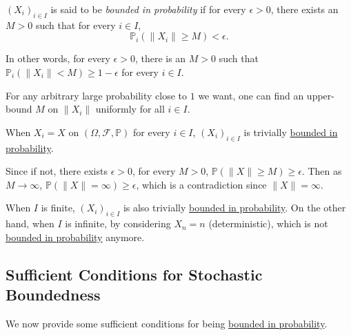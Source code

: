 \begin{definition}\label{def:bounded-in-probability}
	\((X_i)_{i \in I}\) is said to be \emph{bounded in probability} if for every \(\epsilon > 0\), there exists an \(M > 0\) such that for every \(i \in I\),
	\[
		\mathbb{P} _{i}(\lVert X_i \rVert \geq M) < \epsilon .
	\]
\end{definition}

In other words, for every \(\epsilon > 0\), there is an \(M > 0\) such that \(\mathbb{P} _{i}(\lVert X_i \rVert < M) \geq 1 - \epsilon\) for every \(i \in I\).

\begin{intuition}
	For any arbitrary large probability close to \(1\) we want, one can find an upper-bound \(M\) on \(\lVert X_i \rVert \) uniformly for all \(i \in I\).
\end{intuition}

\begin{note}
	When \(X_i = X\) on \((\Omega , \mathscr{F} , \mathbb{P} )\) for every \(i \in I\), \((X_i)_{i \in I}\) is trivially \hyperref[def:bounded-in-probability]{bounded in probability}.
\end{note}
\begin{explanation}
	Since if not, there exists \(\epsilon > 0\), for every \(M > 0\), \(\mathbb{P} (\lVert X \rVert \geq M) \geq \epsilon \). Then as \(M \to \infty \), \(\mathbb{P} (\lVert X \rVert = \infty ) \geq \epsilon \), which is a contradiction since \(\lVert X \rVert = \infty \).
\end{explanation}

\begin{remark}
	When \(I\) is finite, \((X_i)_{i \in I}\) is also trivially \hyperref[def:bounded-in-probability]{bounded in probability}. On the other hand, when \(I\) is infinite, by considering \(X_n = n\) (deterministic), which is not \hyperref[def:bounded-in-probability]{bounded in probability} anymore.
\end{remark}

\subsection{Sufficient Conditions for Stochastic Boundedness}
We now provide some sufficient conditions for being \hyperref[def:bounded-in-probability]{bounded in probability}.


